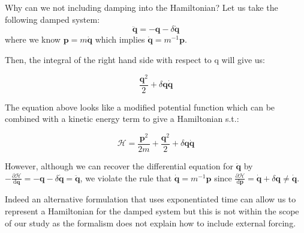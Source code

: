 \documentclass[twoside]{article}
\begin{document}
Why can we not including damping into the Hamiltonian? Let us take the following damped system:
\begin{equation}
\ddot{\mathbf{q}} = -\mathbf{q} - \delta\dot{\mathbf{q}}
\end{equation}
where we know $\mathbf{p}=m\dot{\mathbf{q}}$ which implies $\dot{\mathbf{q}} = m^{-1}\mathbf{p}$.

Then, the integral of the right hand side with respect to q will give us:

\begin{equation}
\frac{\mathbf{q}^2}{2} + \delta \mathbf{q} \dot{\mathbf{q}}
\end{equation}

The equation above looks like a modified potential function which can be combined with a kinetic energy term to give a Hamiltonian s.t.:

\begin{equation}
\mathcal{H} =\frac{ \mathbf{p}^2}{2m} + \frac{\mathbf{q}^2}{2} + \delta \mathbf{q} \dot{\mathbf{q}}
\end{equation}

However, although we can recover the differential equation for $\ddot{\mathbf{q}}$ by $-\frac{\partial\mathcal{H}}{\mathrm{d}\mathbf{q}}  =-\mathbf{q} - \delta\dot{\mathbf{q}} = \ddot{\mathbf{q}}$, we violate the rule that $\dot{\mathbf{q}} = m^{-1}\mathbf{p}$ since $ \frac{\partial\mathcal{H}}{\mathrm{d}\mathbf{p}} =  \dot{\mathbf{q}} +\delta \mathbf{q} \neq \dot{\mathbf{q}} $.

Indeed an alternative formulation that uses exponentiated time can allow us to represent a Hamiltonian for the damped system but this is not within the scope of our study as the formalism does not explain how to include external forcing.

\end{document}
